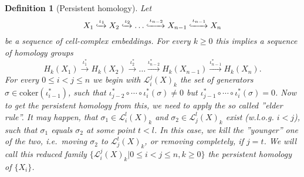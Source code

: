 \documentclass[11pt, a4paper, UKenglish]{article}
\newtheorem{definition}{Definition}
\newcommand{\coker}{\textrm{coker}}
\begin{document}
    \begin{definition}[Persistent homology]
        Let \[X_1\xhookrightarrow{\iota_1} X_2\xhookrightarrow{\iota_2} \ldots\xhookrightarrow{\iota_{n-2}} X_{n-1}\xhookrightarrow{\iota_{n-1}} X_n\] be a sequence of cell-complex embeddings.
        For every $k\geq 0$ this implies a sequence of homology groups
        \[H_k(X_1)\xrightarrow{\iota_{1}^*} H_k(X_2)\xrightarrow{\iota_{2}^*}\ldots \xrightarrow{\iota_{n-2}^*} H_k(X_{n-1})\xrightarrow{\iota_{n-1}^*} H_k(X_n).\]
        For every $0\leq i<j\leq n$ we begin with $\mathcal{L}_i^j(X)_k$ the set of generators $\sigma\in\coker(\iota_{i-1}^*)$, such that $\iota_{j-2}^*\circ\cdots\circ\iota_{i}^*(\sigma)\neq0$ but $\iota_{j-1}^*\circ\cdots\circ\iota_{i}^*(\sigma)=0$.
        Now to get the persistent homology from this, we need to apply the so called ''elder rule''.
        It may happen, that $\sigma_1\in\mathcal{L}_i^l(X)_k$ and $\sigma_2\in\mathcal{L}_j^l(X)_k$ exist (w.l.o.g. $i<j$), such that $\sigma_1$ equals $\sigma_2$ at some point $t<l$.
        In this case, we kill the ''younger'' one of the two, i.e.\ moving $\sigma_2$ to $\mathcal{L}_j^t(X)_k$, or removing completely, if $j=t$.
        We will call this reduced family $\{\mathcal{L}_i^j(X)_k|0\leq i<j\leq n,k\geq0\}$ the persistent homology of $\{X_i\}$.
    \end{definition}
\end{document}

